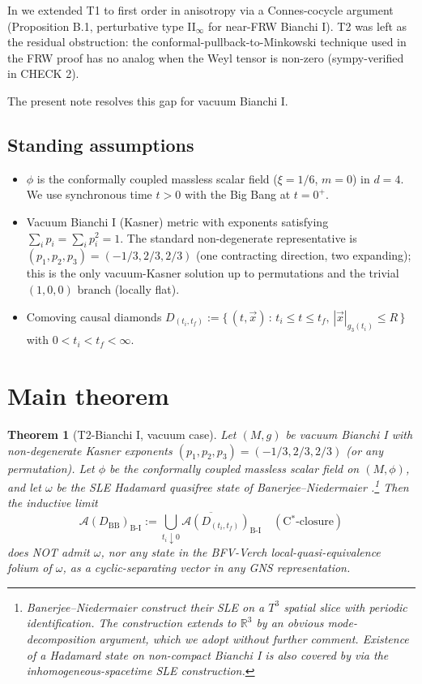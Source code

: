 \documentclass[11pt,a4paper]{article}
\newtheorem{theorem}{Theorem}
\theoremstyle{definition}
\newcommand{\AA}{\mathcal{A}}
\newcommand{\BI}{\mathrm{B\text{-}I}}
\newcommand{\BB}{\mathrm{BB}}
\newcommand{\R}{\mathbb{R}}
\begin{document}
In \cite{RemondiereOpus2026Bianchi} we extended T1 to first order in
anisotropy via a Connes-cocycle argument (Proposition B.1, perturbative
type II$_\infty$ for near-FRW Bianchi I). T2 was left as the residual
obstruction: the conformal-pullback-to-Minkowski technique used in the
FRW proof has no analog when the Weyl tensor is non-zero (sympy-verified
in \cite{RemondiereOpus2026Bianchi} CHECK 2).

The present note resolves this gap for vacuum Bianchi I.

\subsection*{Standing assumptions}

\begin{itemize}
  \item $\phi$ is the conformally coupled massless scalar field
  ($\xi=1/6$, $m=0$) in $d=4$. We use synchronous time $t>0$ with the
  Big Bang at $t=0^+$.
  \item Vacuum Bianchi I (Kasner) metric with exponents satisfying
  $\sum_i p_i = \sum_i p_i^2 = 1$. The standard non-degenerate
  representative is $(p_1,p_2,p_3)=(-1/3,2/3,2/3)$ (one
  contracting direction, two expanding); this is the only vacuum-Kasner
  solution up to permutations and the trivial $(1,0,0)$ branch (locally
  flat).
  \item Comoving causal diamonds
  $D_{(t_i,t_f)} := \{\,(t,\vec x)\,:\,t_i \le t \le t_f,\,
   |\vec x|_{g_3(t_i)} \le R\,\}$
  with $0<t_i<t_f<\infty$.
\end{itemize}

\section{Main theorem}

\begin{theorem}[T2-Bianchi I, vacuum case]\label{thm:T2-BI}
Let $(M,g)$ be vacuum Bianchi I with non-degenerate Kasner exponents
$(p_1,p_2,p_3)=(-1/3,2/3,2/3)$ (or any permutation). Let $\phi$ be the
conformally coupled massless scalar field on $(M,\phi)$, and let $\omega$ be
the SLE Hadamard quasifree state of Banerjee--Niedermaier
\cite{BanerjeeNiedermaier2023}.\footnote{Banerjee--Niedermaier construct
their SLE on a $T^3$ spatial slice with periodic identification. The
construction extends to $\R^3$ by an obvious mode-decomposition argument,
which we adopt without further comment. Existence of a Hadamard state on
non-compact Bianchi I is also covered by \cite{Them-Brum2013} via the
inhomogeneous-spacetime SLE construction.}
Then the inductive limit
\begin{equation}
  \AA(D_\BB)_\BI := \overline{\bigcup_{t_i\downarrow 0} \AA(D_{(t_i,t_f)})_\BI}
  \quad(\text{C${}^*$-closure})
\end{equation}
does NOT admit $\omega$, nor any state in the BFV-Verch local-quasi-equivalence
folium of $\omega$, as a cyclic-separating vector in any GNS representation.
\end{theorem}
\end{document}
